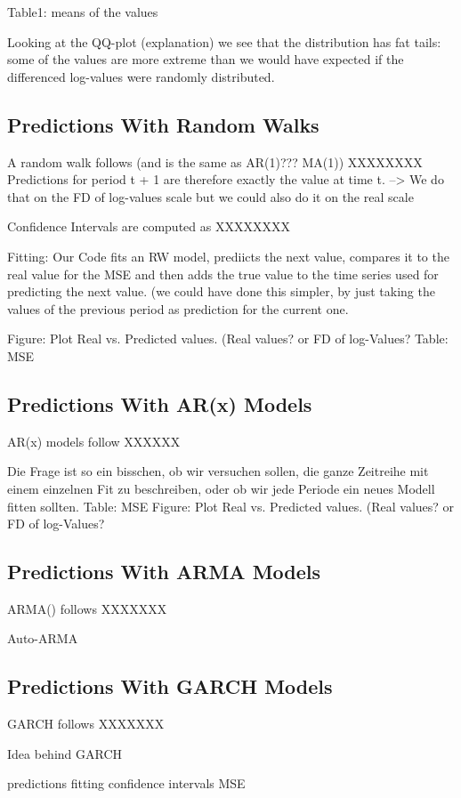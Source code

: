Table1: means of the values

Looking at the QQ-plot (explanation) we see that the distribution has fat tails: some of the values are more extreme than we would have expected if the differenced log-values were randomly distributed. 


\subsection{Predictions With Random Walks}
A random walk follows (and is the same as AR(1)??? MA(1))
XXXXXXXX
Predictions for period t + 1 are therefore exactly the value at time t. --> We do that on the FD of log-values scale but we could also do it on the real scale

Confidence Intervals are computed as
XXXXXXXX

Fitting: 
Our Code fits an RW model, prediicts the next value, compares it to the real value for the MSE and then adds the true value to the time series used for predicting the next value. (we could have done this simpler, by just taking the values of the previous period as prediction for the current one. 

Figure: Plot Real vs. Predicted values. (Real values? or FD of log-Values?
Table: MSE

\subsection{Predictions With AR(x) Models}
AR(x) models follow
XXXXXX

Die Frage ist so ein bisschen, ob wir versuchen sollen, die ganze Zeitreihe mit einem einzelnen Fit zu beschreiben, oder ob wir jede Periode ein neues Modell fitten sollten. 
Table: MSE
Figure: Plot Real vs. Predicted values. (Real values? or FD of log-Values?

\subsection{Predictions With ARMA Models}
ARMA() follows
XXXXXXX


Auto-ARMA


\subsection{Predictions With GARCH Models}
GARCH follows 
XXXXXXX

Idea behind GARCH

predictions
fitting
confidence intervals
MSE

